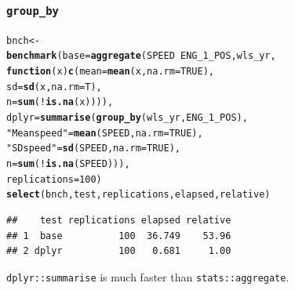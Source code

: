 \documentclass{beamer}\usepackage[]{graphicx}\usepackage[]{color}
\makeatletter
\newcommand{\hlnum}[1]{\textcolor[rgb]{0.686,0.059,0.569}{#1}}%
\newcommand{\hlstr}[1]{\textcolor[rgb]{0.192,0.494,0.8}{#1}}%
\newcommand{\hlopt}[1]{\textcolor[rgb]{0,0,0}{#1}}%
\newcommand{\hlstd}[1]{\textcolor[rgb]{0.345,0.345,0.345}{#1}}%
\newcommand{\hlkwa}[1]{\textcolor[rgb]{0.161,0.373,0.58}{\textbf{#1}}}%
\newcommand{\hlkwb}[1]{\textcolor[rgb]{0.69,0.353,0.396}{#1}}%
\newcommand{\hlkwc}[1]{\textcolor[rgb]{0.333,0.667,0.333}{#1}}%
\newcommand{\hlkwd}[1]{\textcolor[rgb]{0.737,0.353,0.396}{\textbf{#1}}}%
\newenvironment{kframe}{%
 \def\at@end@of@kframe{}%
 \ifinner\ifhmode%
  \def\at@end@of@kframe{\end{minipage}}%
  \begin{minipage}{\columnwidth}%
 \fi\fi%
 \def\FrameCommand##1{\hskip\@totalleftmargin \hskip-\fboxsep
 \colorbox{shadecolor}{##1}\hskip-\fboxsep
     \hskip-\linewidth \hskip-\@totalleftmargin \hskip\columnwidth}%
 \MakeFramed {\advance\hsize-\width
   \@totalleftmargin\z@ \linewidth\hsize
   \@setminipage}}%
 {\par\unskip\endMakeFramed%
 \at@end@of@kframe}
\newenvironment{knitrout}{}{} %
\makeatother
\begin{document}
\begin{frame}[fragile]
  \frametitle{{\tt group\_by}}
\begin{knitrout}\footnotesize
{}\color{fgcolor}\begin{kframe}
\begin{alltt}
\hlstd{bnch} \hlkwb{<-}
  \hlkwd{benchmark}\hlstd{(}\hlkwc{base} \hlstd{=} \hlkwd{aggregate}\hlstd{(SPEED} \hlopt{~} \hlstd{ENG_1_POS, wls_yr,}
                             \hlkwa{function}\hlstd{(}\hlkwc{x}\hlstd{)} \hlkwd{c}\hlstd{(}\hlkwc{mean} \hlstd{=} \hlkwd{mean}\hlstd{(x,} \hlkwc{na.rm} \hlstd{=} \hlnum{TRUE}\hlstd{),}
                                           \hlkwc{sd}   \hlstd{=} \hlkwd{sd}\hlstd{(x,} \hlkwc{na.rm} \hlstd{= T),}
                                           \hlkwc{n}    \hlstd{=} \hlkwd{sum}\hlstd{(}\hlopt{!}\hlkwd{is.na}\hlstd{(x)))),}
            \hlkwc{dplyr} \hlstd{=} \hlkwd{summarise}\hlstd{(}\hlkwd{group_by}\hlstd{(wls_yr, ENG_1_POS),}
                              \hlstr{"Mean speed"} \hlstd{=} \hlkwd{mean}\hlstd{(SPEED,} \hlkwc{na.rm} \hlstd{=} \hlnum{TRUE}\hlstd{),}
                              \hlstr{"SD speed"}   \hlstd{=} \hlkwd{sd}\hlstd{(SPEED,} \hlkwc{na.rm} \hlstd{=} \hlnum{TRUE}\hlstd{),}
                              \hlkwc{n}            \hlstd{=} \hlkwd{sum}\hlstd{(}\hlopt{!}\hlkwd{is.na}\hlstd{(SPEED))),}
            \hlkwc{replications} \hlstd{=} \hlnum{100}\hlstd{)}
\hlkwd{select}\hlstd{(bnch, test, replications, elapsed, relative)}
\end{alltt}
\begin{verbatim}
##    test replications elapsed relative
## 1  base          100  36.749    53.96
## 2 dplyr          100   0.681     1.00
\end{verbatim}
\end{kframe}
\end{knitrout}
  {\tt dplyr::summarise} is much faster than {\tt stats::aggregate}.
\end{frame} 
\end{document}
